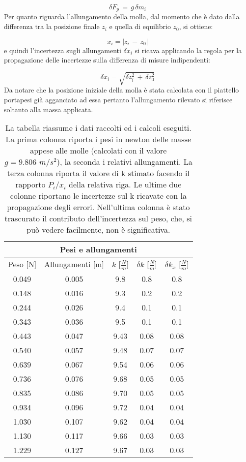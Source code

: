 \begin{equation*}
	\delta F_{p}\, =\, g\,\delta m_i
\end{equation*}
%
Per quanto riguarda l'allungamento della molla, dal momento che è dato dalla differenza tra la posizione finale $z_i$ e quella di equilibrio $z_0$, si ottiene:

\begin{equation*}
	x_i = |z_i\,-\,z_0|
\end{equation*}
%
e quindi l’incertezza sugli allungamenti $\delta x_i$ si ricava applicando la regola per la propagazione delle incertezze sulla differenza di misure indipendenti:

\begin{equation*}
	\delta x_i = \sqrt{\delta z_i^2\, + \,\delta z_0^2}
\end{equation*}
%
Da notare che la posizione iniziale della molla è stata calcolata con il piattello portapesi già agganciato ad essa pertanto l'allungamento rilevato si riferisce soltanto alla massa applicata.\\

\begin{SCtable}
    \centering
    \begin{tabular}{c c c c c}
        \multicolumn{5}{c}{\textbf{Pesi e allungamenti}} \\[1mm]
        \toprule
        Peso [N] & Allungamenti [m] & $k$ [$\frac{N}{m}$] & $\delta k$ [$\frac{N}{m}$] & $\delta k_x$ [$\frac{N}{m}$]\\
        \midrule
        0.049 & 0.005 & 9.8 & 0.8 & 0.8 \\
		0.148 & 0.016 & 9.3 & 0.2 & 0.2 \\
		0.244 & 0.026 & 9.4 & 0.1 & 0.1 \\
		0.343 & 0.036 & 9.5 & 0.1 & 0.1 \\
		0.443 & 0.047 & 9.43 & 0.08 & 0.08 \\
		0.540 & 0.057 & 9.48 & 0.07 & 0.07 \\
		0.639 & 0.067 & 9.54 & 0.06 & 0.06 \\
		0.736 & 0.076 & 9.68 & 0.05 & 0.05 \\
		0.835 & 0.086 & 9.70 & 0.05 & 0.05 \\
		0.934 & 0.096 & 9.72 & 0.04 & 0.04 \\
		1.030 & 0.107 & 9.62 & 0.04 & 0.04 \\
		1.130 & 0.117 & 9.66 & 0.03 & 0.03 \\
		1.229 & 0.127 & 9.67 & 0.03 & 0.03 \\
        \bottomrule
    \end{tabular}
    \caption{La tabella riassume i dati raccolti ed i calcoli eseguiti. La prima colonna riporta i pesi in newton
        delle masse appese alle molle (calcolati con il valore $g = 9.806 \,\, m/s^2$), la seconda i relativi allungamenti.
        La terza colonna riporta il valore di k stimato facendo il rapporto $P_i/x_i$ della relativa riga. Le ultime due colonne
        riportano le incertezze sul k ricavate con la propagazione degli errori. Nell'ultima colonna è stato trascurato il contributo
        dell'incertezza sul peso, che, si può vedere facilmente, non è significativa.}
    \label{tab:dati}
\end{SCtable}

